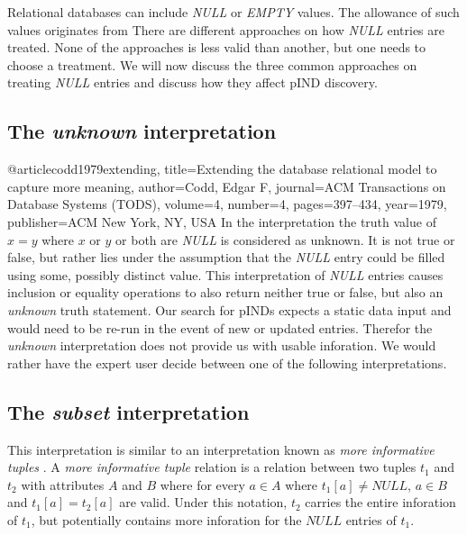 
Relational databases can include \textit{NULL} or \textit{EMPTY} values.
The allowance of such values originates from %
There are different approaches on how \textit{NULL} entries are treated. None of the approaches
is less valid than another, but one needs to choose a treatment. We will now discuss the
three common approaches on treating \textit{NULL} entries and discuss how they affect pIND discovery.

\subsection*{The \textit{unknown} interpretation}
@article{codd1979extending,
  title={Extending the database relational model to capture more meaning},
  author={Codd, Edgar F},
  journal={ACM Transactions on Database Systems (TODS)},
  volume={4},
  number={4},
  pages={397--434},
  year={1979},
  publisher={ACM New York, NY, USA}
}
In the interpretation the truth value of $x = y$ where $x$ or $y$ or both are \textit{NULL} is considered as unknown.
It is not true or false, but rather lies under the assumption that the \textit{NULL} entry could be filled using some,
possibly distinct value. This interpretation of \textit{NULL} entries causes inclusion or equality operations to also
return neither true or false, but also an \textit{unknown} truth statement.
Our search for pINDs expects a static data input and would need to be re-run in the event of new or updated entries.
Therefor the \textit{unknown} interpretation does not provide us with usable inforation. We would rather have the
expert user decide between one of the following interpretations.

\subsection*{The \textit{subset} interpretation}
This interpretation is similar to an interpretation known as \textit{more informative tuples} \cite{zaniolo1982database}.
A \textit{more informative tuple} relation is a relation between two tuples $t_1$ and $t_2$ with attributes $A$ and $B$
where for every $a \in A$ where $t_1[a] \not = NULL$, $a \in B$ and $t_1[a] = t_2[a]$ are valid. Under this notation,
$t_2$ carries the entire inforation of $t_1$, but potentially contains more inforation for the $NULL$ entries of $t_1$.

